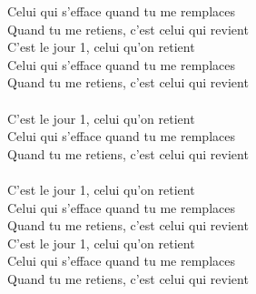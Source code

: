 Celui qui s'efface quand tu me remplaces\\
Quand tu me retiens, c'est celui qui revient\\
C'est le jour 1, celui qu'on retient\\
Celui qui s'efface quand tu me remplaces\\
Quand tu me retiens, c'est celui qui revient\\\\
C'est le jour 1, celui qu'on retient\\
Celui qui s'efface quand tu me remplaces\\
Quand tu me retiens, c'est celui qui revient\\\\
C'est le jour 1, celui qu'on retient\\
Celui qui s'efface quand tu me remplaces\\
Quand tu me retiens, c'est celui qui revient\\
C'est le jour 1, celui qu'on retient\\
Celui qui s'efface quand tu me remplaces\\
Quand tu me retiens, c'est celui qui revient\\
